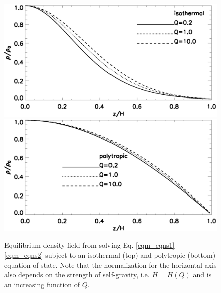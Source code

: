 \begin{figure}
  \includegraphics[width=\linewidth,clip=true,trim=0cm 1.5cm 0cm
    0cm]{figures/compare_iso_density} 
  \includegraphics[width=\linewidth,clip=true,trim=0cm 0cm 0cm
    0.9cm]{figures/compare_poly_density} 
  \caption{Equilibrium density field from solving Eq. \ref{eqm_eqns1}
    --- \ref{eqm_eqns2} subject to an isothermal (top) and polytropic
    (bottom) equation of state. Note that the normalization for the
    horizontal axis also depends on the strength of self-gravity,
    i.e. $H=H(Q)$ and is an increasing function of $Q$. 
    \label{eqm_den}}
\end{figure}



